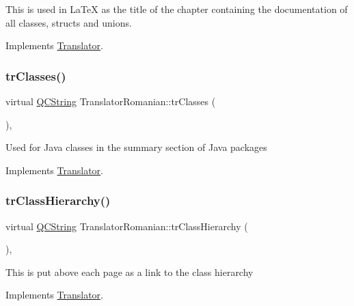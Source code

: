 This is used in La\+TeX as the title of the chapter containing the documentation of all classes, structs and unions. 

Implements \mbox{\hyperlink{class_translator}{Translator}}.

\mbox{\label{class_translator_romanian_ad130230e503d4332b4d5ba15b97e38a7}} 
\subsubsection{\texorpdfstring{trClasses()}{trClasses()}}
{\footnotesize\ttfamily virtual \mbox{\hyperlink{class_q_c_string}{Q\+C\+String}} Translator\+Romanian\+::tr\+Classes (\begin{DoxyParamCaption}{ }\end{DoxyParamCaption})\hspace{0.3cm}{\ttfamily [inline]}, {\ttfamily [virtual]}}

Used for Java classes in the summary section of Java packages 

Implements \mbox{\hyperlink{class_translator}{Translator}}.

\mbox{\label{class_translator_romanian_ad6638d86042538ad3ebac9089416e024}} 
\subsubsection{\texorpdfstring{trClassHierarchy()}{trClassHierarchy()}}
{\footnotesize\ttfamily virtual \mbox{\hyperlink{class_q_c_string}{Q\+C\+String}} Translator\+Romanian\+::tr\+Class\+Hierarchy (\begin{DoxyParamCaption}{ }\end{DoxyParamCaption})\hspace{0.3cm}{\ttfamily [inline]}, {\ttfamily [virtual]}}

This is put above each page as a link to the class hierarchy 

Implements \mbox{\hyperlink{class_translator}{Translator}}.

\mbox{\label{class_translator_romanian_afda52b779c2275beab8f0f59098c09f0}} 
